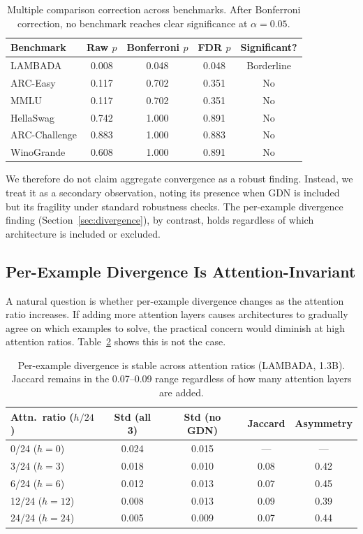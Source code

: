 \documentclass[11pt]{article}
\begin{document}
\begin{table}[t]
\centering
\caption{Multiple comparison correction across benchmarks. After Bonferroni correction, no benchmark reaches clear significance at $\alpha = 0.05$.}
\label{tab:multiple_comparison}
\begin{tabular}{lcccc}
\toprule
Benchmark & Raw $p$ & Bonferroni $p$ & FDR $p$ & Significant? \\
\midrule
LAMBADA & 0.008 & 0.048 & 0.048 & Borderline \\
ARC-Easy & 0.117 & 0.702 & 0.351 & No \\
MMLU & 0.117 & 0.702 & 0.351 & No \\
HellaSwag & 0.742 & 1.000 & 0.891 & No \\
ARC-Challenge & 0.883 & 1.000 & 0.883 & No \\
WinoGrande & 0.608 & 1.000 & 0.891 & No \\
\bottomrule
\end{tabular}
\end{table}

We therefore do not claim aggregate convergence as a robust finding. Instead, we treat it as a secondary observation, noting its presence when GDN is included but its fragility under standard robustness checks. The per-example divergence finding (Section~\ref{sec:divergence}), by contrast, holds regardless of which architecture is included or excluded.

\subsection{Per-Example Divergence Is Attention-Invariant}
\label{sec:bridge}

A natural question is whether per-example divergence changes as the attention ratio increases. If adding more attention layers causes architectures to gradually agree on which examples to solve, the practical concern would diminish at high attention ratios. Table~\ref{tab:bridge} shows this is not the case.

\begin{table}[t]
\centering
\caption{Per-example divergence is stable across attention ratios (LAMBADA, 1.3B). Jaccard remains in the 0.07--0.09 range regardless of how many attention layers are added.}
\label{tab:bridge}
\begin{tabular}{lcccc}
\toprule
Attn.\ ratio ($h/24$) & Std (all 3) & Std (no GDN) & Jaccard & Asymmetry \\
\midrule
0/24 ($h=0$)  & 0.024 & 0.015 & ---  & --- \\
3/24 ($h=3$)  & 0.018 & 0.010 & 0.08 & 0.42 \\
6/24 ($h=6$)  & 0.012 & 0.013 & 0.07 & 0.45 \\
12/24 ($h=12$) & 0.008 & 0.013 & 0.09 & 0.39 \\
24/24 ($h=24$) & 0.005 & 0.009 & 0.07 & 0.44 \\
\bottomrule
\end{tabular}
\end{table}
\end{document}
